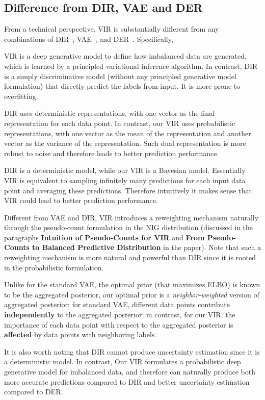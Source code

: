 \subsection{Difference from DIR, VAE and DER}
{From a technical perspective, VIR is substantially different from any combinations of DIR~\citep{DIR}, VAE~\citep{VAE}, and DER~\citep{DER}. Specifically,}
\begin{compactitem}
\item {VIR is a deep generative model to define how imbalanced data are generated, which is learned by a principled variational inference algorithm. In contrast, DIR is a simply discriminative model (without any principled generative model formulation) that directly predict the labels from input. It is more prone to overfitting.}
\item {DIR uses deterministic representations, with one vector as the final representation for each data point. In contrast, our VIR uses probabilistic representations, with one vector as the mean of the representation and another vector as the variance of the representation. Such dual representation is more robust to noise and therefore leads to better prediction performance.}
\item {DIR is a deterministic model, while our VIR is a Bayesian model. Essentially VIR is equivalent to sampling infinitely many predictions for each input data point and averaging these predictions. Therefore intuitively it makes sense that VIR could lead to better prediction performance.}
\item {Different from VAE and DIR, VIR introduces a reweighting mechanism naturally through the pseudo-count formulation in the NIG distribution (discussed in the paragraphs \textbf{Intuition of Pseudo-Counts for VIR} and \textbf{From Pseudo-Counts to Balanced Predictive Distribution} in the paper). Note that such a reweighting mechanism is more natural and powerful than DIR since it is rooted in the probabilistic formulation.}
\item {Unlike for the standard VAE, the optimal prior (that maximizes ELBO) is known to be the aggregated posterior, our optimal prior is a \emph{neighbor-weighted} version of aggregated posterior: for standard VAE, different data points contribute \textbf{independently} to the aggregated posterior; in contrast, for our VIR, the importance of each data point with respect to the aggregated posterior is \textbf{affected} by data points with neighboring labels.}
\item {It is also worth noting that DIR cannot produce uncertainty estimation since it is a deterministic model. In contrast, Our VIR formulates a probabilistic deep generative model for imbalanced data, and therefore can naturally produce both more accurate predictions compared to DIR and better uncertainty estimation compared to DER.}
\end{compactitem}

